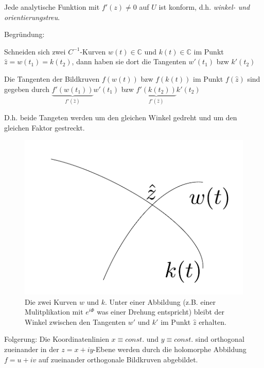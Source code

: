 \documentclass[10pt,a4paper]{article}
\begin{document}
\begin{satz}
$$ $$
Jede analytische Funktion mit $f'(z)\not=0$ auf $U$ ist konform, d.h. \emph{winkel- und orientierungstreu}.

Begründung:

Schneiden sich zwei $C^{-1}$-Kurven $w(t) \in \mathbb{C}$ und $k(t) \in \mathbb{C}$ im Punkt $\hat{z}=w(t_1)=k(t_2)$, dann haben sie dort die Tangenten $w'(t_1)$ bzw $k'(t_2)$

Die Tangenten der Bildkruven $f(w(t))$ bzw $f(k(t))$ im Punkt $f(\hat{z})$ sind gegeben durch $\underbrace{f'(w(t_1))}_{f'(\hat{z})}w'(t_1)$ bzw $\underbrace{f'(k(t_2))}_{f'(\hat{z})}k'(t_2)$

D.h. beide Tangeten werden um den gleichen Winkel gedreht und um den gleichen Faktor gestreckt.

\begin{figure}[H]
\includegraphics[width=\textwidth]{images/winkeltreue}
\caption{Die zwei Kurven $w$ und $k$. Unter einer Abbildung (z.B. einer Mulitplikation mit $e^{i\Phi}$ was einer Drehung entspricht) bleibt der Winkel zwischen den Tangenten $w'$ und $k'$ im Punkt $\hat{z}$ erhalten.}
\end{figure}

\end{satz}

Folgerung: Die Koordinatenlinien $x \equiv const.$ und $y \equiv const.$ sind orthogonal zueinander in der $z=x+iy$-Ebene werden durch die holomorphe Abbildung $f=u+iv$ auf zueinander orthogonale Bildkruven abgebildet.



\end{document}
